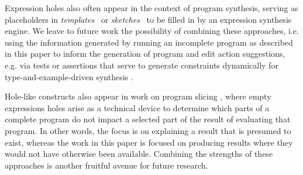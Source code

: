 
Expression holes also often appear in the context of program synthesis, serving as
placeholders in \emph{templates}~\cite{srivastava2013template} or
\emph{sketches}~\cite{solar2009sketching} to be filled in by an expression
synthesis engine. We leave to future work the possibility of combining these approaches, i.e. using the information generated by running an incomplete program as described in this paper to inform the generation of program and edit action suggestions, e.g. via tests or assertions that serve to generate constraints dynamically for type-and-example-driven synthesis \cite{DBLP:conf/popl/FrankleOWZ16}. 





Hole-like constructs also appear in work on program slicing
\cite{DBLP:conf/icfp/PereraACL12,DBLP:journals/pacmpl/RicciottiSPC17}, where empty expressions holes arise as a technical device to determine which parts of a complete program do not impact a selected part of the result of evaluating that program. In other words, the focus is on explaining a result that is presumed to exist, whereas the work in this paper is focused on producing results where they would not have otherwise been available. Combining the strengths of these approaches is another fruitful avenue for future research. 


